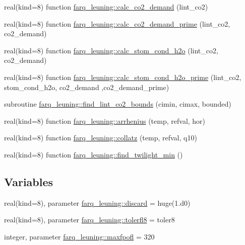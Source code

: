 \begin{DoxyCompactItemize}
\item 
real(kind=8) function \hyperlink{namespacefarq__leuning_adcca2c24ca270f8fc0509c5e71906eff}{farq\+\_\+leuning\+::calc\+\_\+co2\+\_\+demand} (lint\+\_\+co2)
\item 
real(kind=8) function \hyperlink{namespacefarq__leuning_a4ea88f530f197b5a15c695c83e15e1a1}{farq\+\_\+leuning\+::calc\+\_\+co2\+\_\+demand\+\_\+prime} (lint\+\_\+co2, co2\+\_\+demand)
\item 
real(kind=8) function \hyperlink{namespacefarq__leuning_ae3bd8aaff5c63ef30cb1004d8a5c9639}{farq\+\_\+leuning\+::calc\+\_\+stom\+\_\+cond\+\_\+h2o} (lint\+\_\+co2, co2\+\_\+demand)
\item 
real(kind=8) function \hyperlink{namespacefarq__leuning_a08bfe77c4f0f53d4e8973f289ebbba77}{farq\+\_\+leuning\+::calc\+\_\+stom\+\_\+cond\+\_\+h2o\+\_\+prime} (lint\+\_\+co2, stom\+\_\+cond\+\_\+h2o, co2\+\_\+demand                                                                                                                                                                                                                           ,co2\+\_\+demand\+\_\+prime)
\item 
subroutine \hyperlink{namespacefarq__leuning_a7f904e78bc57baa0ad78b38d7455e710}{farq\+\_\+leuning\+::find\+\_\+lint\+\_\+co2\+\_\+bounds} (cimin, cimax, bounded)
\item 
real(kind=8) function \hyperlink{namespacefarq__leuning_a6d031c781aa0a5b3a55dd340813a2c33}{farq\+\_\+leuning\+::arrhenius} (temp, refval, hor)
\item 
real(kind=8) function \hyperlink{namespacefarq__leuning_ab284bec4bd11bda7c190c6ae2de979fb}{farq\+\_\+leuning\+::collatz} (temp, refval, q10)
\item 
real(kind=8) function \hyperlink{namespacefarq__leuning_a2a73acc8f131feea39acb9830fadc1cc}{farq\+\_\+leuning\+::find\+\_\+twilight\+\_\+min} ()
\end{DoxyCompactItemize}
\subsection*{Variables}
\begin{DoxyCompactItemize}
\item 
real(kind=8), parameter \hyperlink{namespacefarq__leuning_a31a2c362c8646a0912470a61a19135b2}{farq\+\_\+leuning\+::discard} = huge(1.d0)
\item 
real(kind=8), parameter \hyperlink{namespacefarq__leuning_a544a9b3986d12bf60c748eff03f49665}{farq\+\_\+leuning\+::tolerfl8} = toler8
\item 
integer, parameter \hyperlink{namespacefarq__leuning_ae18ccfcc4ad61a2d80f126c65258fffd}{farq\+\_\+leuning\+::maxfpofl} = 320
\end{DoxyCompactItemize}
